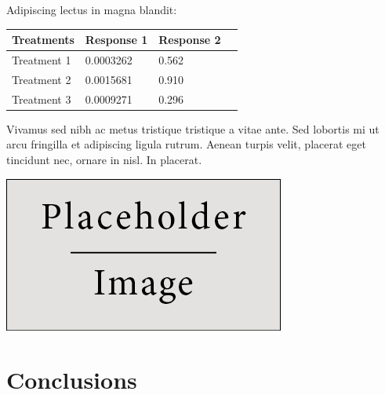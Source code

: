 \documentclass[a0,landscape]{a0poster}
\begin{document}
\begin{multicols}{3}
Adipiscing lectus in magna blandit:

\begin{center}\vspace{1cm}
\begin{tabular}{l l l l}
\toprule
\textbf{Treatments} & \textbf{Response 1} & \textbf{Response 2} \\
\midrule
Treatment 1 & 0.0003262 & 0.562 \\
Treatment 2 & 0.0015681 & 0.910 \\
Treatment 3 & 0.0009271 & 0.296 \\
\bottomrule
\end{tabular}
\end{center}\vspace{1cm}

Vivamus sed nibh ac metus tristique tristique a vitae ante. Sed lobortis mi ut arcu fringilla et adipiscing ligula rutrum. Aenean turpis velit, placerat eget tincidunt nec, ornare in nisl. In placerat.

\begin{center}\vspace{1cm}
\includegraphics[width=0.8\linewidth]{placeholder}
\end{center}\vspace{1cm}


\color{SaddleBrown} %

\section*{Conclusions}


\end{multicols}
\end{document}
